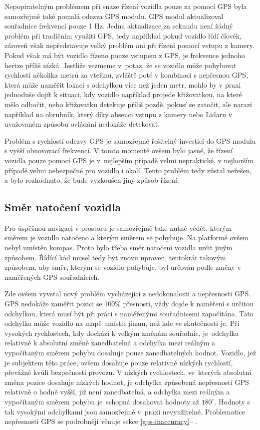 \documentclass[czech, bachelor]{diploma}
\newcommand{\filipref}[1]{\ref{#1}\,--\,\nameref{#1}}
\begin{document}
Nepopiratelným problémem při snaze řízení vozidla pouze za pomocí GPS byla samozřejmě také pomalá odezva GPS modulu. GPS modul
aktualizoval souřadnice frekvencí pouze 1 Hz. Jedna aktualizace za sekundu není žádný problém při tradičním využití GPS, tedy
například pokud vozidlo řídí člověk, zároveň však nepředstavuje velký problém ani při řízení pomocí vstupu z kamery. Pokud však
má být vozidlo řízeno pouze vstupem z GPS, je frekvence jednoho hertze příliš nízká. Jestliže vezmeme v~potaz, že se vozidlo může
pohybovat rychlostí několika metrů za vteřinu, zvláště poté v kombinaci s nepřesnou GPS, která může naměřit lokaci s odchylkou
více než jeden metr, mohlo by v praxi jednoduše dojít k situaci, kdy vozidlo například projede křižovatkou, na které mělo odbočit,
nebo křižovatku detekuje příliš pozdě, pokusí se zatočit, ale narazí například na obrubník, který díky absenci vstupu z kamery
nebo Lidaru v uvažovaném způsobu ovládání nedokáže detekovat.

Problém s rychlostí odezvy GPS je samozřejmě řešitelný investicí do GPS modulu s vyšší obnovovací frekvencí. V tomto momentě ovšem
bylo jasné, že řízení vozidla pouze pomocí GPS je v~nejlepším případě velmi nepraktické, v nejhorším případě velmi nebezpečné
pro vozidlo i okolí. Tento problém tedy zůstal neřešen, a bylo rozhodnuto, že bude vyzkoušen jiný způsob řízení.

\subsection{Směr natočení vozidla} \label{directions-and-angles}

Pro úspěšnou navigaci v prostoru je samozřejmě také nutné vědět, kterým směrem je vozidlo natočeno a kterým směrem se pohybuje.
Na platformě ovšem nebyl umístěn kompas. Proto bylo třeba směr natočení vozidla určit jiným způsobem. Řídící kód musel tedy být
znovu upraven, tentokrát takovým způsobem, aby směr, kterým se vozidlo pohybuje, byl určován podle změny v naměřených GPS
souřadnicích.

Zde ovšem vyvstal nový problém vycházející z nedokonalosti a nepřesnosti GPS. GPS nedokáže zaměřit pozici se 100\% přesností,
vždy dojde k naměření s určitou odchylkou, která musí být při práci s naměřenými souřadnicemi započítána. Tato odchylka může
vozidlo na mapě umístit jinam, než kde ve skutečnosti je. Při vysokých rychlostech, kdy dochází k velkým změnám souřadnic,
je~odchylka relativně k absolutní změně zanedbatelná a odchylka mezi reálným a vypočítaným směrem pohybu dosahuje pouze
zanedbatelných hodnot. Vozidlo, jež je subjektem této práce, ovšem dosahuje pouze relativně nízkých rychlostí, převážně kvůli
bezpečnosti provozu. V nízkých rychlostech, ve~kterých absolutní změna pozice dosahuje nízkých hodnot, je odchylka způsobená
nepřesností GPS relativně o hodně vyšší, již není zanedbatelná, a odchylka mezi reálným a vypočítaným směrem pohybu je~schopná
dosahovat hodnoty až $180^{\circ}$. Hodnoty s tak vysokými odchylkami jsou samozřejmě v~praxi nevyužitelné. Problematice
nepřesnosti GPS se podrobněji věnuje sekce \filipref{gps-inaccuracy}.
\end{document}
